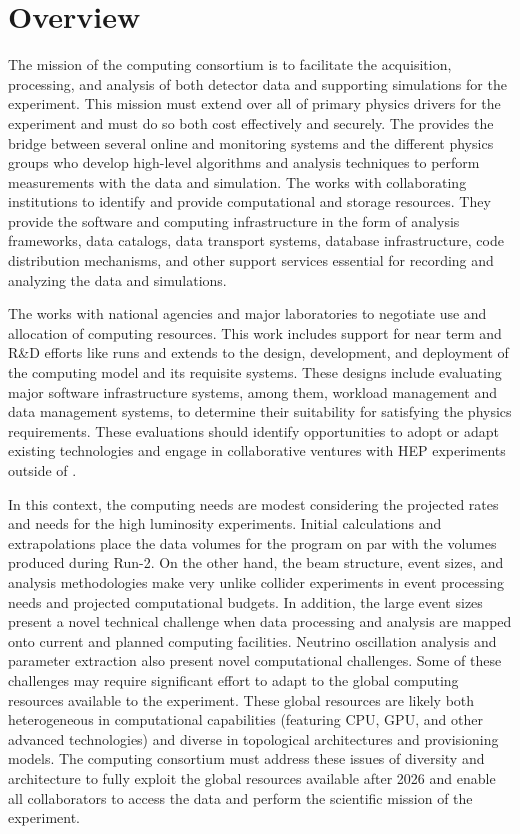 \section{Overview}
\label{ch:exec-comp-ovr}
The mission of the computing consortium is to facilitate the acquisition, processing, and analysis of both detector data and supporting simulations for the  experiment.  This mission must extend over all of primary physics drivers for the experiment and must do so both cost effectively and securely. The  provides the bridge between several online  and monitoring systems and the different physics groups who develop high-level algorithms and analysis techniques to perform measurements with the  data and simulation. The  works with collaborating institutions to identify and provide computational and storage resources.  They provide the software and computing infrastructure in the form of analysis frameworks, data catalogs, data transport systems, database infrastructure, code distribution mechanisms, and other support services essential for recording and analyzing the data and simulations. 

The  works with national agencies and major laboratories to negotiate use and allocation of computing resources.  This work includes support for near term and R\&D efforts like  runs and extends to the design, development, and deployment of the  computing model and its requisite systems.
These designs include evaluating major software infrastructure systems, among them, workload management and data management systems, to determine their suitability for satisfying the  physics requirements.   These evaluations should identify opportunities to adopt or adapt existing technologies and engage in collaborative ventures with HEP experiments outside of . 

In this context, the  computing needs are modest considering the projected rates and needs for the high luminosity  experiments.  Initial calculations and extrapolations place the data volumes for the   program on par with the volumes produced during  Run-2.  On the other hand, the  beam structure, event sizes, and analysis methodologies make  very unlike collider experiments in event processing needs and projected computational budgets.  In addition, the large  event sizes present a novel technical challenge when data processing and analysis are mapped onto  current and planned computing facilities.  Neutrino oscillation analysis and parameter extraction also present novel computational challenges.   Some of these challenges may require significant effort to adapt to the global computing resources available to the experiment.  These global resources are likely both heterogeneous in computational capabilities (featuring CPU, GPU, and other advanced technologies) and diverse in topological architectures and provisioning models.  The  computing consortium must address these issues of diversity and architecture to fully exploit the global resources available after 2026 and enable all collaborators to access the data and perform the scientific mission of the experiment.  

